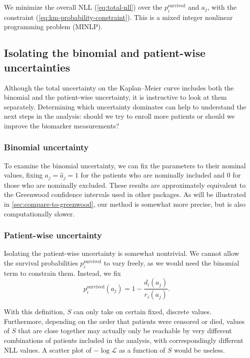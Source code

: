 \documentclass[article]{jss}
\newcommand{\KM}{Kaplan--Meier} %
\begin{document}
We minimize the overall NLL (\ref{eq:total-nll}) over the \(p_i^\text{survived}\) and \(a_j\), with the constraint (\ref{eq:km-probability-constraint}).  This is a mixed integer nonlinear programming problem (MINLP).

\subsection{Isolating the binomial and patient-wise uncertainties}\label{sec:isolating-uncertainties}

Although the total uncertainty on the \KM{} curve includes both the binomial and the patient-wise uncertainty, it is instructive to look at them separately.  Determining which uncertainty dominates can help to understand the next steps in the analysis: should we try to enroll more patients or should we improve the biomarker measurements?

\subsubsection{Binomial uncertainty}

To examine the binomial uncertainty, we can fix the parameters to their nominal values, fixing \(a_j=\hat{a}_j=1\) for the patients who are nominally included and \(0\) for those who are nominally excluded.  These results are approximately equivalent to the Greenwood confidence intervals used in other packages.  As will be illustrated in \cref{sec:compare-to-greenwood}, our method is somewhat more precise, but is also computationally slower.

\subsubsection{Patient-wise uncertainty}

Isolating the patient-wise uncertainty is somewhat nontrivial.  We cannot allow the survival probabilities \(p_i^\text{survived}\) to vary freely, as we would need the binomial term to constrain them.  Instead, we fix
\begin{equation}
p_i^\text{survived}(a_j) = 1 - \frac{d_i(a_j)}{r_i(a_j)}.
\end{equation}

With this definition, \(S\) can only take on certain fixed, discrete values.  Furthermore, depending on the order that patients were censored or died, values of \(S\) that are close together may actually only be reachable by very different combinations of patients included in the analysis, with correspondingly different NLL values.  A scatter plot of \(-\log\mathcal{L}\) as a function of \(S\) would be useless.
\end{document}

